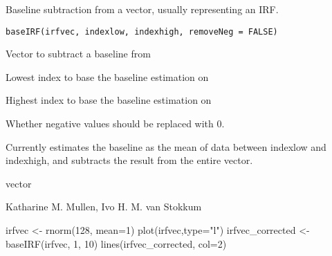 \documentclass{article}
\begin{document}
\begin{Description}\relax
Baseline subtraction from a vector, usually representing an IRF.
\end{Description}
\begin{Usage}
\begin{verbatim}
baseIRF(irfvec, indexlow, indexhigh, removeNeg = FALSE) 
\end{verbatim}
\end{Usage}
\begin{Arguments}
\begin{ldescription}
\item[\code{irfvec}] Vector to subtract a baseline from
\item[\code{indexlow}] Lowest index to base the baseline estimation on
\item[\code{indexhigh}] Highest index to base the baseline estimation on
\item[\code{removeNeg}] Whether negative values should be replaced with 0.
\end{ldescription}
\end{Arguments}
\begin{Details}\relax
Currently estimates the baseline as the mean of data between 
indexlow and indexhigh, and subtracts the result from the 
entire vector.
\end{Details}
\begin{Value}
vector
\end{Value}
\begin{Author}\relax
Katharine M. Mullen, Ivo H. M. van Stokkum
\end{Author}
\begin{Examples}
\begin{ExampleCode} 
irfvec <- rnorm(128, mean=1) 
plot(irfvec,type="l") 
irfvec_corrected <- baseIRF(irfvec, 1, 10)
lines(irfvec_corrected, col=2)
\end{ExampleCode}
\end{Examples}
\end{document}
